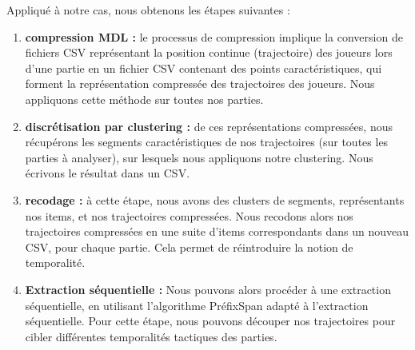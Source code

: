 \noindent Appliqué à notre cas, nous obtenons les étapes suivantes :
\begin{enumerate}
    \item \textbf{compression MDL :} le processus de compression implique la conversion de fichiers CSV représentant la position continue (trajectoire) des joueurs lors d'une partie en un fichier CSV contenant des points caractéristiques, qui forment la représentation compressée des trajectoires des joueurs. Nous appliquons cette méthode sur toutes nos parties. 
    \item \textbf{discrétisation par clustering :} de ces représentations compressées, nous récupérons les segments caractéristiques de nos trajectoires (sur toutes les parties à analyser), sur lesquels nous appliquons notre clustering. Nous écrivons le résultat dans un CSV.
    \item \textbf{recodage :} à cette étape, nous avons des clusters de segments, représentants nos items, et nos trajectoires compressées. Nous recodons alors nos trajectoires compressées en une suite d'items correspondants dans un nouveau CSV, pour chaque partie. Cela permet de réintroduire la notion de temporalité. 
    
    \item \textbf{Extraction séquentielle :} Nous pouvons alors procéder à une extraction séquentielle, en utilisant l'algorithme PréfixSpan adapté à l'extraction séquentielle. Pour cette étape, nous pouvons découper nos trajectoires pour cibler différentes temporalités tactiques des parties.
\end{enumerate}

